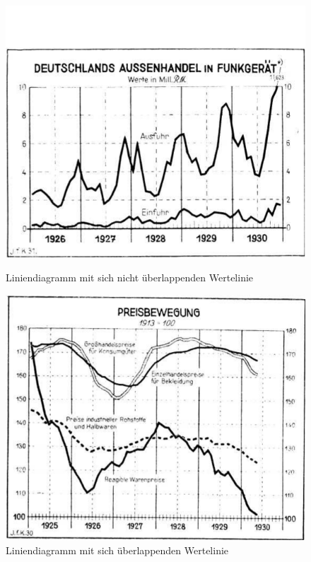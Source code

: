 \begin{figure}[H]
    \vspace{0.75em}

    \begin{minipage}{0.475\textwidth} %
        \centering
        \includegraphics[width=\linewidth]{Methodik/img/linebank_non_overlapping.png}
        \caption{ Liniendiagramm mit sich nicht überlappenden Wertelinie}
        \label{fig:linebank_non_overlapping}
    \end{minipage}\hfill %
    \begin{minipage}{0.475\textwidth} %
        \centering
        \includegraphics[width=\linewidth]{Methodik/img/linebank_overlapping.png}
        \caption{ Liniendiagramm mit sich überlappenden Wertelinie}
        \label{fig:linebank_overlapping}
    \end{minipage}
\end{figure}
